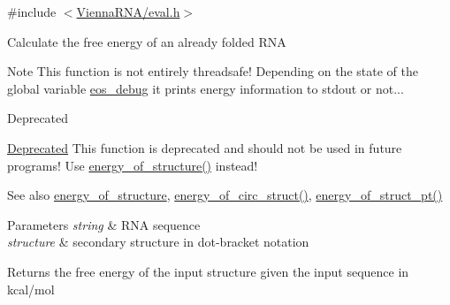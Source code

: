 {\ttfamily \#include $<$\hyperlink{eval_8h}{Vienna\+R\+N\+A/eval.\+h}$>$}

Calculate the free energy of an already folded R\+NA

\begin{DoxyNote}{Note}
This function is not entirely threadsafe! Depending on the state of the global variable \hyperlink{group__eval__deprecated_ga567530678f6260a1a649a5beca5da4c5}{eos\+\_\+debug} it prints energy information to stdout or not...~\newline
 
\end{DoxyNote}
\begin{DoxyRefDesc}{Deprecated}
\item[\hyperlink{deprecated__deprecated000058}{Deprecated}]This function is deprecated and should not be used in future programs! Use \hyperlink{group__eval__deprecated_gaf93986cb3cb29770ec9cca69c9fab8cf}{energy\+\_\+of\+\_\+structure()} instead!\end{DoxyRefDesc}


\begin{DoxySeeAlso}{See also}
\hyperlink{group__eval__deprecated_gaf93986cb3cb29770ec9cca69c9fab8cf}{energy\+\_\+of\+\_\+structure}, \hyperlink{group__eval__deprecated_ga657222e2758c46bf13b416ef3032e417}{energy\+\_\+of\+\_\+circ\+\_\+struct()}, \hyperlink{group__eval__deprecated_ga27ce6f68512d43bf1fe14a06c9d76d5c}{energy\+\_\+of\+\_\+struct\+\_\+pt()} 
\end{DoxySeeAlso}

\begin{DoxyParams}{Parameters}
{\em string} & R\+NA sequence \\
\hline
{\em structure} & secondary structure in dot-\/bracket notation \\
\hline
\end{DoxyParams}
\begin{DoxyReturn}{Returns}
the free energy of the input structure given the input sequence in kcal/mol 
\end{DoxyReturn}
\mbox{\label{group__eval__deprecated_ga27ce6f68512d43bf1fe14a06c9d76d5c}} 
